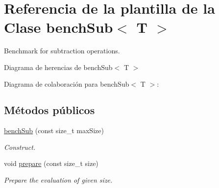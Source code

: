 \hypertarget{classbenchSub}{}\section{Referencia de la plantilla de la Clase bench\+Sub$<$ T $>$}
\label{classbenchSub}


Benchmark for subtraction operations.  




Diagrama de herencias de bench\+Sub$<$ T $>$


Diagrama de colaboración para bench\+Sub$<$ T $>$\+:
\subsection*{Métodos públicos}
\begin{DoxyCompactItemize}
\item 
\hyperlink{classbenchSub_aa085847391dff12537024b70601107dd}{bench\+Sub} (const size\+\_\+t max\+Size)
\begin{DoxyCompactList}\small\item\em Construct. \end{DoxyCompactList}\item 
void \hyperlink{classbenchSub_a00120c49297be543c5d5e65289405eec}{prepare} (const size\+\_\+t size)
\begin{DoxyCompactList}\small\item\em Prepare the evaluation of given size. \end{DoxyCompactList}\end{DoxyCompactItemize}
